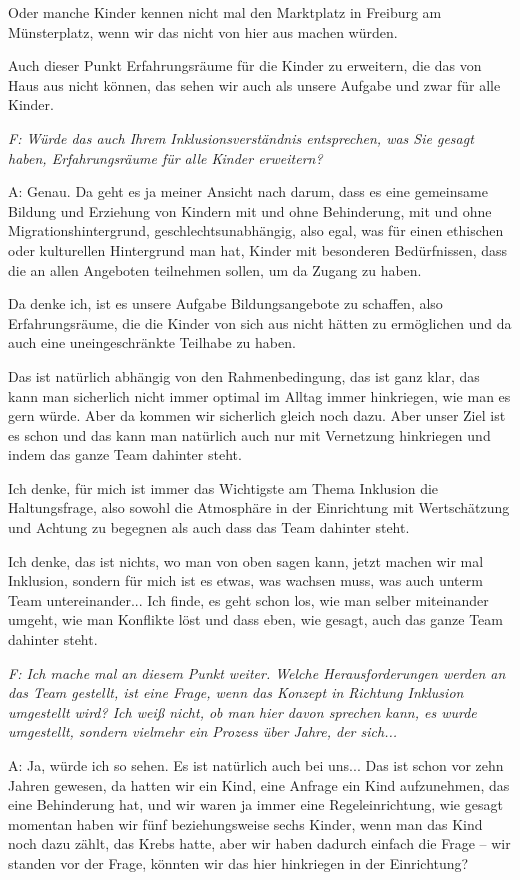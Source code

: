 \begin{linenumbers*}
Oder manche Kinder kennen nicht mal den Marktplatz in Freiburg am Münsterplatz, wenn wir das nicht von hier aus machen würden. 

Auch dieser Punkt Erfahrungsräume für die Kinder zu erweitern, die das von Haus aus nicht können, das sehen wir auch als unsere Aufgabe und zwar für alle Kinder.

\emph{F: Würde das auch Ihrem Inklusionsverständnis entsprechen, was Sie gesagt haben, Erfahrungsräume für alle Kinder erweitern?}

A: Genau. Da geht es ja meiner Ansicht nach darum, dass es eine gemeinsame Bildung und Erziehung von Kindern mit und ohne Behinderung, mit und ohne Migrationshintergrund, geschlechtsunabhängig, also egal, was für einen ethischen oder kulturellen Hintergrund man hat, Kinder mit besonderen Bedürfnissen, dass die an allen Angeboten teilnehmen sollen, um da Zugang zu haben. 

Da denke ich, ist es unsere Aufgabe Bildungsangebote zu schaffen, also Erfahrungsräume, die die Kinder von sich aus nicht hätten zu ermöglichen und da auch eine uneingeschränkte Teilhabe zu haben. 

Das ist natürlich abhängig von den Rahmenbedingung, das ist ganz klar, das kann man sicherlich nicht immer optimal im Alltag immer hinkriegen, wie man es gern würde. Aber da kommen wir sicherlich gleich noch dazu. Aber unser Ziel ist es schon und das kann man natürlich auch nur mit Vernetzung hinkriegen und indem das ganze Team dahinter steht. 

Ich denke, für mich ist immer das Wichtigste am Thema Inklusion die Haltungsfrage, also sowohl die Atmosphäre in der Einrichtung mit Wertschätzung und Achtung zu begegnen als auch dass das Team dahinter steht. 

Ich denke, das ist nichts, wo man von oben sagen kann, jetzt machen wir mal Inklusion, sondern für mich ist es etwas, was wachsen muss, was auch unterm Team untereinander... Ich finde, es geht schon los, wie man selber miteinander umgeht, wie man Konflikte löst und dass eben, wie gesagt, auch das ganze Team dahinter steht. 

\emph{F: Ich mache mal an diesem Punkt weiter. Welche Herausforderungen werden an das Team gestellt, ist eine Frage, wenn das Konzept in Richtung Inklusion umgestellt wird? Ich weiß nicht, ob man hier davon sprechen kann, es wurde umgestellt, sondern vielmehr ein Prozess über Jahre, der sich...}

A: Ja, würde ich so sehen. Es ist natürlich auch bei uns... Das ist schon vor zehn Jahren gewesen, da hatten wir ein Kind, eine Anfrage ein Kind aufzunehmen, das eine Behinderung hat, und wir waren ja immer eine Regeleinrichtung, wie gesagt momentan haben wir fünf beziehungsweise sechs Kinder, wenn man das Kind noch dazu zählt, das Krebs hatte, aber wir haben dadurch einfach die Frage -- wir standen vor der Frage, könnten wir das hier hinkriegen in der Einrichtung? 


\end{linenumbers*}
